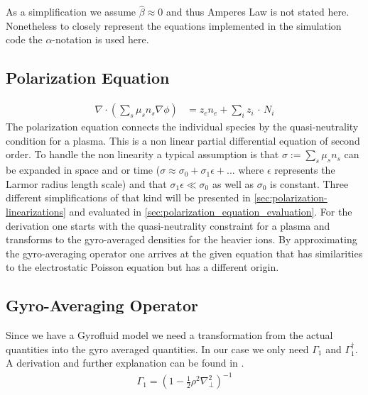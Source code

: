 \documentclass[master.tex]{subfiles}
\begin{document}
As a simplification we assume $\hat{\beta} \approx 0$ and thus Amperes Law is not stated here. Nonetheless to closely represent the equations implemented in the simulation code the $\alpha$-notation is used here.

\subsection{Polarization Equation}

\begin{align}
    \nabla \cdot \left( \sum_s \mu_s n_s \nabla \phi  \right) &= z_e n_e + \sum_i z_i \, \cdot \, N_i \label{eq:polarization}
\end{align}
The polarization equation connects the individual species by the quasi-neutrality condition for a plasma. This is a non linear partial differential equation of second order. To handle the non linearity a typical assumption is that $\sigma := \sum_s \mu_s n_s$ can be expanded in space and or time ($\sigma \approx \sigma_0 + \sigma_1 \epsilon + ...$ where $\epsilon$ represents the Larmor radius length scale) and that $\sigma_1 \epsilon \ll \sigma_0$ as well as $\sigma_0$ is constant. Three different simplifications of that kind will be presented in \autoref{sec:polarization-linearizations} and evaluated in \autoref{sec:polarization_equation_evaluation}. For the derivation one starts with the quasi-neutrality constraint for a plasma and transforms to the gyro-averaged densities for the heavier ions. By approximating the gyro-averaging operator one arrives at the given equation that has similarities to the electrostatic Poisson equation but has a different origin.

\subsection{Gyro-Averaging Operator}
Since we have a Gyrofluid model we need a transformation from the actual quantities into the gyro averaged quantities. In our case we only need $\Gamma_1$ and $\Gamma_1^\dagger$. A derivation and further explanation can be found in \cite{HeldDisseration}.
\begin{align}
    \label{eq:gyro-averaging-opeartor}
    \Gamma_1 = \left(1- \frac{1}{2} \rho^2 \nabla_\perp^2\right)^{-1}
\end{align}
\end{document}
